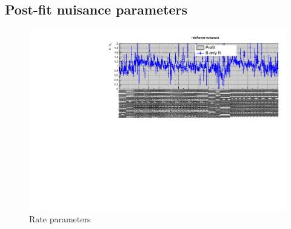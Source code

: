 %
%

\clearpage
\subsection{Post-fit nuisance parameters}
\label{app:nuispost}

\begin{figure}[h!]
  \centering
  \caption{Rate parameters}
  \includegraphics[width=1.\linewidth]{figures/results/36invfb_preapproval/postfit/nuis/Rates_nuisances}
\end{figure}

